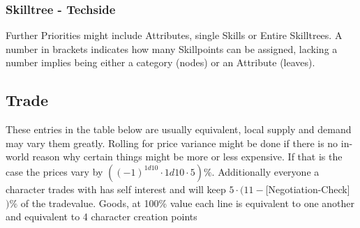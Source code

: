     \subsubsection{Skilltree - Techside}
    Further Priorities might include Attributes, single Skills or Entire Skilltrees.
    A number in brackets indicates how many
    Skillpoints can be assigned, lacking a number implies being either a category (nodes) or an Attribute (leaves).
    \pagebreak
    \subsection{Trade}\label{subsec:trade}
    These entries in the table below are usually equivalent, local supply and demand may vary them greatly.
    Rolling for price variance might be done if there is no in-world reason why certain things might be more or
    less expensive.
    If that is the case the prices vary by \(((-1)^{1d10}\cdot1d10\cdot5) \%\).
    Additionally everyone a character trades with has self interest and will keep \(5\cdot(11-\)[Negotiation-Check]\()\%\) of
    the tradevalue.\vspace{1.5cm}
    Goods, at 100\% value each line is equivalent to one another and equivalent to 4 character creation points \par
